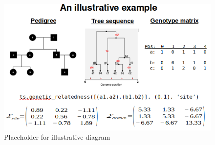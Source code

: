
\begin{figure}
    \centering
    \includegraphics[width=\textwidth]{Figures/ts_gr_example.png}
    \caption{Placeholder for illustrative diagram}
    \label{fig:illustration}
\end{figure}

